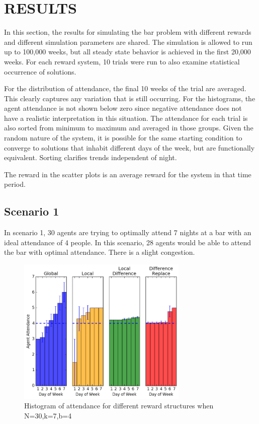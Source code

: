 \documentclass[letterpaper, 10 pt, conference]{ieeeconf}
\begin{document}
\section{RESULTS}
\label{sec:results}
In this section, the results for simulating the bar problem with different rewards and different simulation parameters are shared.  The simulation is allowed to run up to 100,000 weeks, but all steady state behavior is achieved in the first 20,000 weeks.  For each reward system, 10 trials were run to also examine statistical occurrence of solutions.

For the distribution of attendance, the final 10 weeks of the trial are averaged.  This clearly captures any variation that is still occurring.  For the histograms, the agent attendance is not shown below zero since negative attendance does not have a realistic interpretation in this situation.  The attendance for each trial is also sorted from minimum to maximum and averaged in those groups.  Given the random nature of the system, it is possible for the same starting condition to converge to solutions that inhabit different days of the week, but are functionally equivalent.  Sorting clarifies trends independent of night.

The reward in the scatter plots is an average reward for the system in that time period.

\subsection{Scenario 1}
In scenario 1, 30 agents are trying to optimally attend 7 nights at a bar with an ideal attendance of 4 people.  In this scenario, 28 agents would be able to attend the bar with optimal attendance.  There is a slight congestion.
\begin{figure}
    \centering
    \includegraphics[width=230pt]{Histograms0.png}
    \caption{Histogram of attendance for different reward structures when N=30,k=7,b=4}
    \label{fig:Scenario1_hist}
\end{figure}
\end{document}

